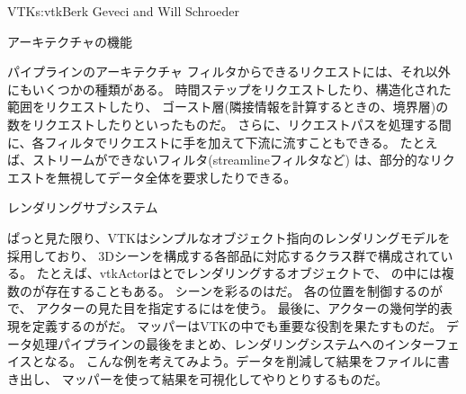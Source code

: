 \begin{aosachapter}{VTK}{s:vtk}{Berk Geveci and Will Schroeder}
\begin{aosasect1}{アーキテクチャの機能}
\begin{aosasect2}{パイプラインのアーキテクチャ}
フィルタからできるリクエストには、それ以外にもいくつかの種類がある。
時間ステップをリクエストしたり、構造化された範囲をリクエストしたり、
ゴースト層(隣接情報を計算するときの、境界層)の数をリクエストしたりといったものだ。
さらに、リクエストパスを処理する間に、各フィルタでリクエストに手を加えて下流に流すこともできる。
たとえば、ストリームができないフィルタ(streamlineフィルタなど)
は、部分的なリクエストを無視してデータ全体を要求したりできる。

\end{aosasect2}

\begin{aosasect2}{レンダリングサブシステム}

ぱっと見た限り、VTKはシンプルなオブジェクト指向のレンダリングモデルを採用しており、
3Dシーンを構成する各部品に対応するクラス群で構成されている。
たとえば、{vtkActor}はとでレンダリングするオブジェクトで、
の中には複数のが存在することもある。
シーンを彩るのはだ。
各の位置を制御するのがで、
アクターの見た目を指定するにはを使う。
最後に、アクターの幾何学的表現を定義するのがだ。
マッパーはVTKの中でも重要な役割を果たすものだ。
データ処理パイプラインの最後をまとめ、レンダリングシステムへのインターフェイスとなる。
こんな例を考えてみよう。データを削減して結果をファイルに書き出し、
マッパーを使って結果を可視化してやりとりするものだ。


\end{aosasect2}
\end{aosasect1}
\end{aosachapter}
